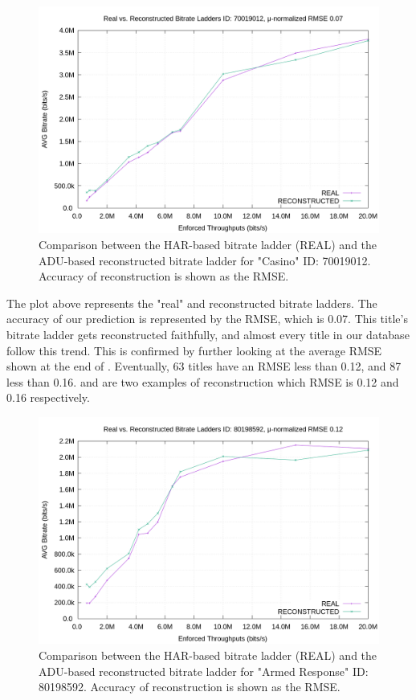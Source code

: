 \begin{figure}[!h]
  \centering
  \includegraphics[width=\columnwidth]{img/70019012.png}
  \caption{Comparison between the HAR-based bitrate ladder (REAL) and the
  ADU-based reconstructed bitrate ladder for "Casino" ID: 70019012. Accuracy of
  reconstruction is shown as the RMSE.}
  \label{fig:bl_comparison_good}
\end{figure}

The plot above represents the "real" and reconstructed bitrate ladders.  The
accuracy of our prediction is represented by the RMSE, which is 0.07.  This
title's bitrate ladder gets reconstructed faithfully, and almost every title in
our database follow this trend. This is confirmed by further looking at the
average RMSE shown at the end of . Eventually,
63 titles have an RMSE less than 0.12, and 87 less than 0.16.
 and  are two
examples of reconstruction which RMSE is 0.12 and 0.16 respectively.

\newpage

\begin{figure}[!h]
  \centering
  \includegraphics[width=\columnwidth]{img/80198592}
  \caption{Comparison between the HAR-based bitrate ladder (REAL) and the
  ADU-based reconstructed bitrate ladder for "Armed Response" ID: 80198592.
  Accuracy of reconstruction is shown as the RMSE.}
  \label{fig:bl_comparison_good_1}
\end{figure}

